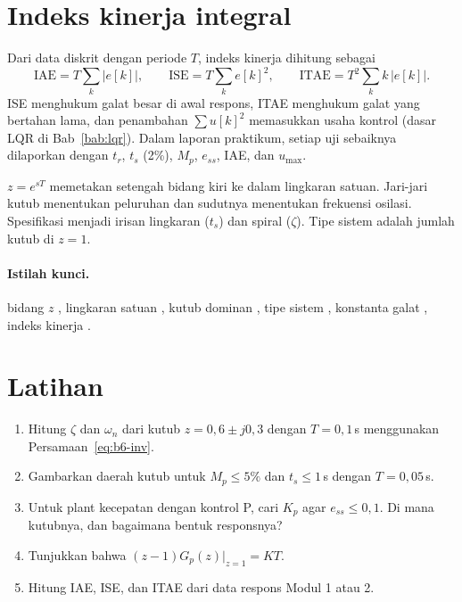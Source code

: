 \section{Indeks kinerja integral}
Dari data diskrit dengan periode $T$, indeks kinerja dihitung sebagai
\begin{equation}
	\text{IAE} = T\sum_k|e[k]|,\qquad \text{ISE} = T\sum_ke[k]^2,\qquad \text{ITAE} = T^2\sum_kk\,|e[k]|.
\end{equation}
ISE menghukum galat besar di awal respons, ITAE menghukum galat yang bertahan lama, dan penambahan $\sum u[k]^2$ memasukkan usaha kontrol (dasar LQR di Bab~\ref{bab:lqr}). Dalam laporan praktikum, setiap uji sebaiknya dilaporkan dengan $t_r$, $t_s$ (2\%), $M_p$, $e_{ss}$, IAE, dan $u_{\max}$.

\begin{ringkasan}
	$z = e^{sT}$ memetakan setengah bidang kiri ke dalam lingkaran satuan. Jari-jari kutub menentukan peluruhan dan sudutnya menentukan frekuensi osilasi. Spesifikasi menjadi irisan lingkaran ($t_s$) dan spiral ($\zeta$). Tipe sistem adalah jumlah kutub di $z = 1$.\\[3pt]
\end{ringkasan}

\paragraph{Istilah kunci.} bidang $z$ , lingkaran satuan , kutub dominan , tipe sistem , konstanta galat , indeks kinerja .

\section*{Latihan}
\begin{enumerate}
	\item Hitung $\zeta$ dan $\omega_n$ dari kutub $z = 0{,}6 \pm j0{,}3$ dengan $T = 0{,}1$\,s menggunakan Persamaan~\eqref{eq:b6-inv}.
	\item Gambarkan daerah kutub untuk $M_p \le 5\%$ dan $t_s \le 1$\,s dengan $T = 0{,}05$\,s.
	\item Untuk plant kecepatan dengan kontrol P, cari $K_p$ agar $e_{ss} \le 0{,}1$. Di mana kutubnya, dan bagaimana bentuk responsnya?
	\item Tunjukkan bahwa $(z-1)G_p(z)|_{z=1} = KT$.
	\item Hitung IAE, ISE, dan ITAE dari data respons Modul 1 atau 2.
\end{enumerate}
